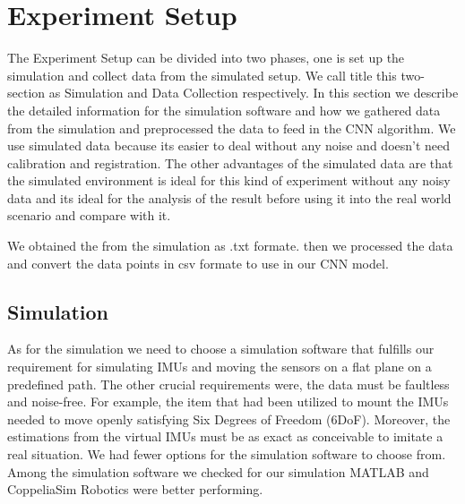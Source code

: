 
\chapter{Experiment Setup}\label{chapter:experiment_setup}
The Experiment Setup can be divided into two phases, one is set up the simulation and collect data from the simulated setup. We call title this two-section as Simulation and Data Collection respectively.
In this section we describe the detailed information for the simulation software and how we gathered data from the simulation and preprocessed the data to feed in the CNN algorithm.
We use simulated data because its easier to deal without any noise and doesn't need calibration and registration. The other advantages of the simulated data are that the simulated environment is ideal for this kind of experiment without any noisy data and its ideal for the analysis of the result before using it into the real world scenario and compare with it.

We obtained the from the simulation as .txt formate. then we processed the data and convert the data points in csv formate to use in our CNN model.

\section{Simulation}
As for the simulation we need to choose a simulation software that fulfills our requirement for simulating IMUs and moving the sensors on a flat plane on a predefined path. The other crucial requirements were, the data must be faultless and noise-free. For example, the item that had been utilized to mount the IMUs needed to move openly satisfying Six Degrees of Freedom (6DoF). Moreover, the estimations from the virtual IMUs must be as exact as conceivable to imitate a real situation. We had fewer options for the simulation software to choose from. Among the simulation software we checked for our simulation MATLAB and CoppeliaSim Robotics were better performing.

